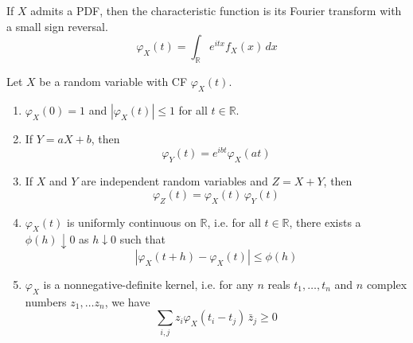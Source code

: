 \documentclass{article}
\begin{document}
      If $X$ admits a PDF, then the characteristic function is its Fourier transform with a small sign reversal. 
      \begin{equation}
        \varphi_X (t) = \int_\mathbb{R} e^{i t x} f_X (x)\,dx
      \end{equation}

      \begin{theorem}[Properties of CF]
        Let $X$ be a random variable with CF $\varphi_X (t)$. 
        \begin{enumerate}
          \item $\varphi_X (0) = 1$  and $|\varphi_X (t)| \leq 1$ for all $t \in \mathbb{R}$. 
          \item If $Y = a X + b$, then 
          \begin{equation}
            \varphi_Y (t) = e^{i b t} \varphi_X (a t)
          \end{equation}
          \item If $X$ and $Y$ are independent random variables and $Z = X + Y$, then 
          \begin{equation}
            \varphi_Z (t) = \varphi_X (t) \, \varphi_Y (t)
          \end{equation}
          \item $\varphi_X (t)$ is uniformly continuous on $\mathbb{R}$, i.e. for all $t \in \mathbb{R}$, there exists a $\phi(h) \downarrow 0$ as $h \downarrow 0$ such that 
          \begin{equation}
            |\varphi_X (t + h) - \varphi_X (t)| \leq \phi(h)
          \end{equation}
          \item $\varphi_X$ is a nonnegative-definite kernel, i.e. for any $n$ reals $t_1, \ldots, t_n$ and $n$ complex numbers $z_1, \ldots z_n$, we have 
          \begin{equation}
            \sum_{i, j} z_i \varphi_X (t_i - t_j) \, \bar{z}_j \geq 0
          \end{equation}
        \end{enumerate}
      \end{theorem}
\end{document}
